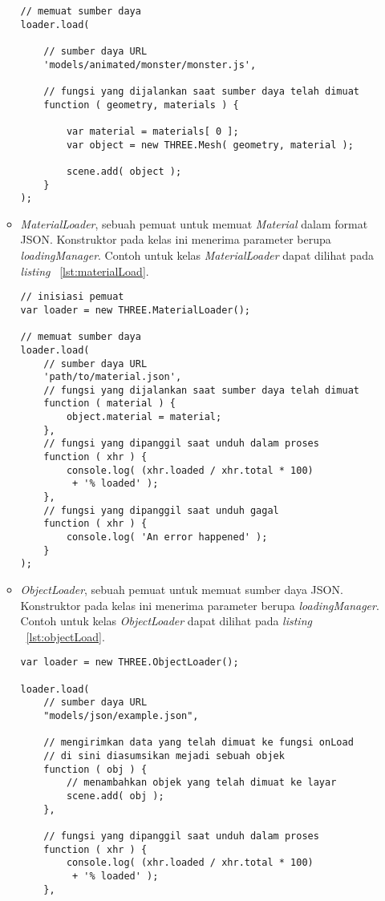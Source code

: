 \begin{itemize}
\begin{itemize}
\begin{lstlisting}[caption={Contoh penggunaan kelas {\it JSONLoader}.}, label={lst:jsonLoad},captionpos=b]
// memuat sumber daya
loader.load(

	// sumber daya URL
	'models/animated/monster/monster.js',

	// fungsi yang dijalankan saat sumber daya telah dimuat
	function ( geometry, materials ) {

		var material = materials[ 0 ];
		var object = new THREE.Mesh( geometry, material );

		scene.add( object );
	}
);
\end{lstlisting}
		\item {\it MaterialLoader}, sebuah pemuat untuk memuat {\it Material} dalam format JSON. Konstruktor pada kelas ini menerima parameter berupa  {\it loadingManager}. Contoh untuk kelas {\it MaterialLoader} dapat dilihat pada {\it listing} ~\ref{lst:materialLoad}.
\begin{lstlisting}[caption={Contoh penggunaan kelas {\it MaterialLoader}.}, label={lst:materialLoad},captionpos=b]
// inisiasi pemuat
var loader = new THREE.MaterialLoader();

// memuat sumber daya
loader.load(
	// sumber daya URL
	'path/to/material.json',
	// fungsi yang dijalankan saat sumber daya telah dimuat
	function ( material ) {
		object.material = material;
	},
	// fungsi yang dipanggil saat unduh dalam proses
	function ( xhr ) {
		console.log( (xhr.loaded / xhr.total * 100)
		 + '% loaded' );
	},
	// fungsi yang dipanggil saat unduh gagal
	function ( xhr ) {
		console.log( 'An error happened' );
	}
);
\end{lstlisting}
		\item {\it ObjectLoader}, sebuah pemuat untuk memuat sumber daya JSON. Konstruktor pada kelas ini menerima parameter berupa  {\it loadingManager}. Contoh untuk kelas {\it ObjectLoader} dapat dilihat pada {\it listing} ~\ref{lst:objectLoad}.
\begin{lstlisting}[caption={Contoh penggunaan kelas {\it ObjectLoader}.}, label={lst:objectLoad},captionpos=b]
var loader = new THREE.ObjectLoader();

loader.load(
    // sumber daya URL
    "models/json/example.json",

    // mengirimkan data yang telah dimuat ke fungsi onLoad
    // di sini diasumsikan mejadi sebuah objek
    function ( obj ) {
		// menambahkan objek yang telah dimuat ke layar
        scene.add( obj );
    },

    // fungsi yang dipanggil saat unduh dalam proses
    function ( xhr ) {
        console.log( (xhr.loaded / xhr.total * 100)
         + '% loaded' );
    },


\end{lstlisting}
\end{itemize}
\end{itemize}
